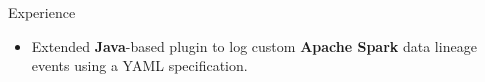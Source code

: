 \documentclass{resume} %
\begin{document}
\begin{workSection}{Experience}
\begin{itemize}
		\item Extended \textbf{Java}-based plugin to log custom \textbf{Apache Spark} data lineage events using a YAML specification. %


	\end{itemize}
	
	

\end{workSection}
\end{document}
